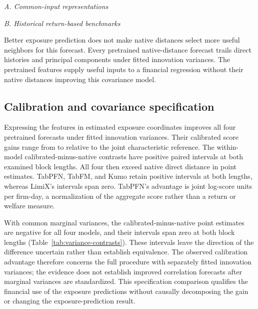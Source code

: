 \documentclass[11pt]{article}
\begin{document}
\begin{table}[htbp]
  \centering\small
  \textit{A. Common-input representations}\par\smallskip
  
  \par\medskip
  \textit{B. Historical return-based benchmarks}\par\smallskip
  
  \caption{Exposure prediction and covariance forecasts. Forecast gains are
    summed Gaussian log-score differences over 2020--2025 relative to the joint
    characteristic reference, on \FirmDays{} common firm-days. Networks match
    effective neighbor counts and fit firm-specific innovation variances.
    Exposure $R^2$ averages annual out-of-fold predictions over 2016--2025.
    Encoder context contains 256 observations where applicable. Panel B uses
    prior returns directly to construct exposure
  neighborhoods.}\label{tab:measurement}
\end{table}

Better exposure prediction does not make native distances select more useful
neighbors for this forecast. Every pretrained native-distance forecast trails
direct histories and principal components under fitted innovation variances.
The pretrained features supply useful inputs to a financial regression without
their native distances improving this covariance model.

\subsection{Calibration and covariance specification}
Expressing the features in estimated exposure coordinates improves all four
pretrained forecasts under fitted innovation variances. Their
calibrated score gains range from \LimixCalibrated{} to
\KumoCalibrated{} relative to the joint characteristic reference. The
within-model calibrated-minus-native contrasts have positive paired
intervals at both examined block lengths. All four then exceed
native direct distance in point estimates. TabPFN, TabFM, and Kumo
retain positive
intervals at both lengths, whereas LimiX's intervals span zero.
TabPFN's advantage is \PfnDirectNormalized{} joint log-score units per firm-day,
a normalization of the aggregate score rather than a return or welfare measure.

With common marginal variances, the calibrated-minus-native point estimates
are negative for all four models, and their intervals span zero at both block
lengths (Table~\ref{tab:variance-contrasts}). These intervals leave
the direction
of the difference uncertain rather than establish equivalence. The observed
calibration advantage therefore concerns the full procedure with separately
fitted innovation variances; the evidence does not establish improved
correlation forecasts after marginal variances are standardized. This
specification comparison qualifies the financial use of the exposure
predictions without causally decomposing the gain or changing the
exposure-prediction result.
\end{document}
